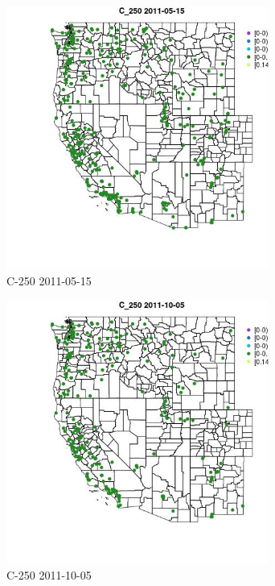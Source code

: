 \begin{figure} 
\centering  
\includegraphics[width=0.77\textwidth]{Code_Outputs/ML_input_report_ML_input_PM25_Step5_part_d_de_duplicated_aves_ML_input_MapObsC_2502011-05-15.jpg} 
\caption{\label{fig:ML_input_report_ML_input_PM25_Step5_part_d_de_duplicated_aves_ML_inputMapObsC_2502011-05-15}C-250 2011-05-15} 
\end{figure} 
 

\begin{figure} 
\centering  
\includegraphics[width=0.77\textwidth]{Code_Outputs/ML_input_report_ML_input_PM25_Step5_part_d_de_duplicated_aves_ML_input_MapObsC_2502011-10-05.jpg} 
\caption{\label{fig:ML_input_report_ML_input_PM25_Step5_part_d_de_duplicated_aves_ML_inputMapObsC_2502011-10-05}C-250 2011-10-05} 
\end{figure} 
 

